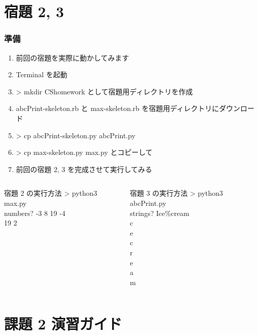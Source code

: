 %
%
\section{宿題 2, 3}
\begin{frame}[containsverbatim]
\frametitle{準備}
  \begin{enumerate}
\scriptsize
\item 前回の宿題を実際に動かしてみます
\item Terminal を起動
\item > mkdir CShomework として宿題用ディレクトリを作成
\item abcPrint-skeleton.rb と max-skeleton.rb を宿題用ディレクトリにダウンロード
\item > cp abcPrint-skeleton.py abcPrint.py
\item > cp max-skeleton.py max.py とコピーして
\item 前回の宿題 2, 3 を完成させて実行してみる
  \end{enumerate}
  \begin{columns}
    \begin{column}{0.6\textwidth}
      \begin{itembox}{宿題 2 の実行方法}
\scriptsize
> python3 max.py\\
numbers? -3 8 19 -4\\
19 2
      \end{itembox}
    \end{column}
    \begin{column}{0.4\textwidth}
      \begin{itembox}{宿題 3 の実行方法}
\scriptsize
> python3 abcPrint.py\\
strings? Ice\%cream\\
c\\
e\\
c\\
r\\
e\\
a\\
m
      \end{itembox}
    \end{column}
  \end{columns}
\end{frame}
%
%
\section{課題 2 演習ガイド}
